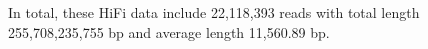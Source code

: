 In total, these HiFi data include 22,118,393 reads
with total length 255,708,235,755 bp
and average length 11,560.89 bp.
